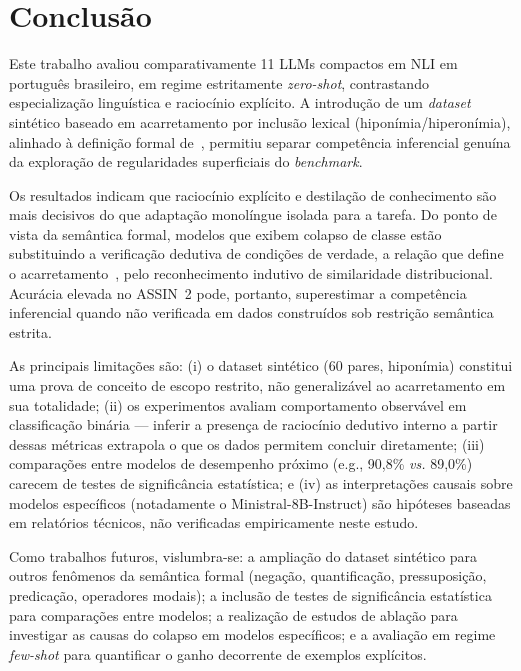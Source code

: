 \documentclass[12pt]{article}
\begin{document}
\section{Conclusão}

Este trabalho avaliou comparativamente 11 LLMs compactos em NLI em português
brasileiro, em regime estritamente \emph{zero-shot}, contrastando especialização
linguística e raciocínio explícito. A introdução de um \emph{dataset} sintético
baseado em acarretamento por inclusão lexical (hiponímia/hiperonímia), alinhado
à definição formal de~\cite{Ferreira2019}, permitiu separar competência
inferencial genuína da exploração de regularidades superficiais do
\emph{benchmark}.

Os resultados indicam que raciocínio explícito e destilação de conhecimento são
mais decisivos do que adaptação monolíngue isolada para a tarefa. Do ponto de
vista da semântica formal, modelos que exibem colapso de classe estão
substituindo a verificação dedutiva de condições de verdade, a relação que
define o acarretamento~\cite{Ferreira2019}, pelo reconhecimento indutivo de
similaridade distribucional. Acurácia elevada no ASSIN~2 pode, portanto,
superestimar a competência inferencial quando não verificada em dados construídos
sob restrição semântica estrita.

As principais limitações são: (i) o dataset sintético (60 pares, hiponímia)
constitui uma prova de conceito de escopo restrito, não generalizável ao
acarretamento em sua totalidade; (ii) os experimentos avaliam comportamento
observável em classificação binária --- inferir a presença de raciocínio
dedutivo interno a partir dessas métricas extrapola o que os dados permitem
concluir diretamente; (iii) comparações entre modelos de desempenho próximo
(e.g., 90,8\% \emph{vs.} 89,0\%) carecem de testes de significância
estatística; e (iv) as interpretações causais sobre modelos específicos
(notadamente o Ministral-8B-Instruct) são hipóteses baseadas em relatórios
técnicos, não verificadas empiricamente neste estudo.

Como trabalhos futuros, vislumbra-se: a ampliação do dataset sintético para
outros fenômenos da semântica formal (negação, quantificação, pressuposição,
predicação, operadores modais); a inclusão de testes de significância
estatística para comparações entre modelos; a realização de estudos de ablação
para investigar as causas do colapso em modelos específicos; e a avaliação em
regime \emph{few-shot} para quantificar o ganho decorrente de exemplos
explícitos.



\end{document}
